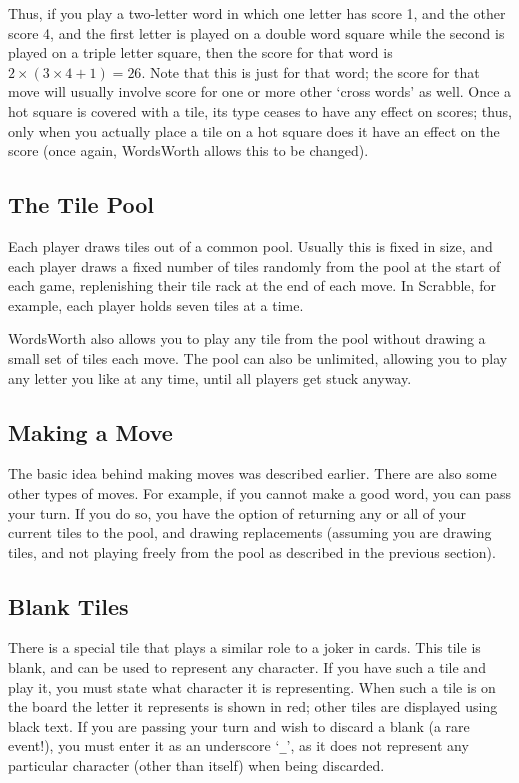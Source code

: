 Thus, if you play a two-letter word in which one letter has score
1, and the other score 4, and the first letter is played on a
double word square while the second is played on a triple letter
square, then the score for that word is $2\times(3\times4+1) = 26$. Note
that this is just for that word; the score for that move will
usually involve score for one or more other `cross words' as well. Once
a hot square is covered with a tile, its type ceases to have
any effect on scores; thus, only when you actually place a tile on
a hot square does it have an effect on the score (once again,
WordsWorth allows this to be changed).

\subsection{The Tile Pool}

Each player draws tiles out of a common pool. Usually this is 
fixed in size, and each player draws a fixed number of tiles
randomly from the pool at the start of each game, replenishing
their tile rack at the end of each move. In Scrabble, for example,
each player holds seven tiles at a time.

WordsWorth also allows you to play any tile from the pool without
drawing a small set of tiles each move. The pool can also be
unlimited, allowing you to play any letter you like at
any time, until all players get stuck anyway.

\subsection{Making a Move}

The basic idea behind making moves was described earlier. There 
are also some other types of moves. For example, if you cannot
make a good word, you can pass your turn. If you do so, you have
the option of returning any or all of your current tiles to the
pool, and drawing replacements (assuming you are drawing tiles,
and not playing freely from the pool as described in the previous 
section).

\subsection{Blank Tiles}

There is a special tile that plays a similar role to a joker in
cards. This tile is blank, and can be used to represent any
character. If you have such a tile and play it, you must state
what character it is representing. When such a tile is on the
board the letter it represents is shown in red; other tiles are 
displayed using black text.
If you are passing your turn and wish to discard a blank (a rare
event!), you must enter it as an underscore `{\tt \_}', as it does
not represent any particular character (other than itself) when
being discarded. 

